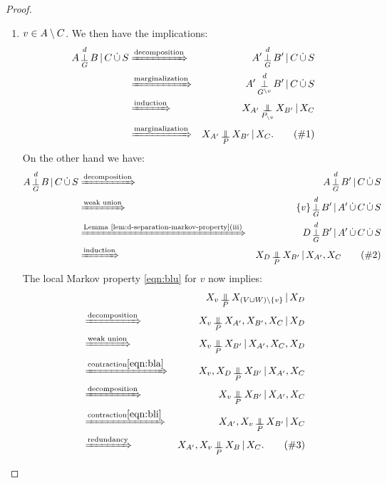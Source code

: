 \begin{proof}
\begin{enumerate}[label=(\roman*)]
    \item $v \in A\setminus C$.
    We then have the implications:
    \begin{align*}
      A \Perp^d_G  B \given C \dcup S
      & \xRightarrow{\text{decomposition}}  & A' \Perp^d_G B' \given C \dcup S \\
      & \xRightarrow{\text{marginalization}} &  A' \Perp^d_{G^{\sm v}}  B' \given C \dcup S\\
      & \xRightarrow{\text{induction}} & X_{A'} \Indep_{P_{\sm v}}  X_{B'} \given X_C \\
      & \xRightarrow{\text{marginalization}} & X_{A'} \Indep_{P} X_{B'} \given X_C. \tag{\#1}
    \end{align*}
    On the other hand we have:
    \begin{align*}
      A \Perp^d_G  B \given C \dcup S 
      & \xRightarrow{\text{decomposition}}  & A \Perp^d_G   B' \given C \dcup S   \\
      & \xRightarrow{\text{weak union}}  & \{v\} \Perp^d_G  B' \given A' \dcup C \dcup S    \\
      & \xRightarrow{\text{Lemma~\ref{lem:d-separation-markov-property}(iii)}}  & D  \Perp^d_G   B' \given A' \dcup C \dcup S \\ 
      & \xRightarrow{\text{induction}}  &   X_D  \Indep_{P}  X_{B'} \given X_{A'},X_C \tag{\#2}
    \end{align*}
    The local Markov property \eqref{eqn:blu} for $v$ now implies:
    \begin{align*}
    &&X_v \Indep_{P}  X_{(V \cup W) \sm \{v\}} \given X_D\\ 
    &\xRightarrow{\text{decomposition}} & 
    X_v \Indep_{P}  X_{A'}, X_{B'}, X_C \given X_D \\
    & \xRightarrow{\text{weak union}}  & 
    X_v \Indep_{P} X_{B'} \given X_{A'}, X_C, X_D \\ 
    & \xRightarrow{\text{contraction}\eqref{eqn:bla}}  & X_v, X_D  \Indep_{P}  X_{B'} \given X_{A'}, X_C \\
    & \xRightarrow{\text{decomposition}}  & X_v \Indep_{P}  X_{B'} \given X_{A'}, X_C\\
    & \xRightarrow{\text{contraction} \eqref{eqn:bli}}  &  X_{A'},X_v \Indep_{P}  X_{B'} \given X_C\\
    & \xRightarrow{\text{redundancy}}  & X_{A'}, X_v \Indep_{P}  X_B \given X_C.
     \tag{\#3}
    \end{align*}

\end{enumerate}
\end{proof}
